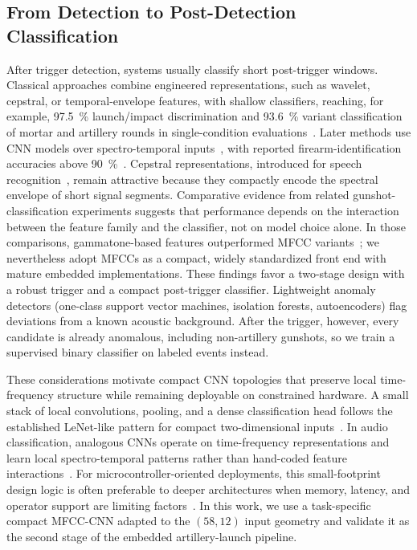 ﻿\documentclass[conference]{IEEEtran}
\begin{document}
\subsection{From Detection to Post-Detection Classification}
After trigger detection, systems usually classify short post-trigger windows. Classical approaches combine engineered representations, such as wavelet, cepstral, or temporal-envelope features, with shallow classifiers, reaching, for example, 97.5~\% launch/impact discrimination and 93.6~\% variant classification of mortar and artillery rounds in single-condition evaluations~\cite{desai2006launch_impact,hohil2007variants}. Later methods use CNN models over spectro-temporal inputs~\cite{piczak2015esc_cnn,salamon2017esc_aug}, with reported firearm-identification accuracies above 90~\%~\cite{raponi2022sound_of_guns}. Cepstral representations, introduced for speech recognition~\cite{davis1980mfcc}, remain attractive because they compactly encode the spectral envelope of short signal segments. Comparative evidence from related gunshot-classification experiments suggests that performance depends on the interaction between the feature family and the classifier, not on model choice alone. In those comparisons, gammatone-based features outperformed MFCC variants~\cite{svatos2024fcc}; we nevertheless adopt MFCCs as a compact, widely standardized front end with mature embedded implementations. These findings favor a two-stage design with a robust trigger and a compact post-trigger classifier. Lightweight anomaly detectors (one-class support vector machines, isolation forests, autoencoders) flag deviations from a known acoustic background. After the trigger, however, every candidate is already anomalous, including non-artillery gunshots, so we train a supervised binary classifier on labeled events instead.

These considerations motivate compact CNN topologies that preserve local time-frequency structure while remaining deployable on constrained hardware. A small stack of local convolutions, pooling, and a dense classification head follows the established LeNet-like pattern for compact two-dimensional inputs~\cite{lecun1998gradient}. In audio classification, analogous CNNs operate on time-frequency representations and learn local spectro-temporal patterns rather than hand-coded feature interactions~\cite{piczak2015esc_cnn,hershey2017cnn_audio}. For microcontroller-oriented deployments, this small-footprint design logic is often preferable to deeper architectures when memory, latency, and operator support are limiting factors~\cite{banbury2021micronets}. In this work, we use a task-specific compact MFCC-CNN adapted to the $(58,12)$ input geometry and validate it as the second stage of the embedded artillery-launch pipeline.
\end{document}
